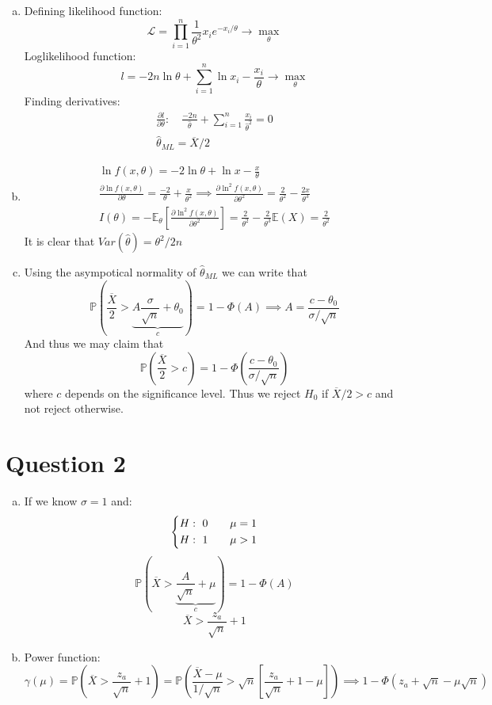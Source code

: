 \documentclass[11pt, oneside]{article}
\newcommand{\E}{\mathbb{E}}
\renewcommand{\P}{\mathbb{P}}
\renewcommand{\t}{\theta}
\begin{document}
\begin{enumerate}[(a)]
	\item Defining likelihood function:
	\[
	\mathcal{L} = \prod_{i=1}^{n} \frac{1}{\t^{2}}x_{i}e^{-x_{i}/\t} \to \max_{\t}
	\]
	Loglikelihood function:
	\[
	l = -2n\ln\t + \sum_{i=1}^{n} \ln x_{i} - \frac{x_{i}}{\t} \to \max_{\t}
	\]
	Finding derivatives:
	\begin{gather*}
		\frac{\partial l }{\partial \t}: \quad \frac{-2n}{\hat\t} + \sum_{i=1}^{n}\frac{x_{i}}{\hat\t^{2}} = 0 \\
		 \hat\t_{ML} = \overline{X}/2
	\end{gather*}
\item \begin{gather*}
	\ln f(x, \t) = -2\ln \t + \ln x - \frac{x}{\t} \\
	\frac{\partial \ln f(x, \t)}{\partial \t} = \frac{-2}{\t} + \frac{x}{\t^{2}} \implies \frac{\partial \ln^{2} f(x, \t)}{\partial \t^{2}} = \frac{2}{\t^{2}}-\frac{2x}{\t^{3}}\\
	I(\t) = - \E_{\t} \left[  \frac{\partial \ln^{2} f(x, \t)}{\partial \t^{2}}\right] = \frac{2}{\t^{2}} - \frac{2}{\t^{3}} \E(X) = \frac{2}{\t^{2}}
\end{gather*}
It is clear that $ Var(\hat\t)  = \t^{2}/2n$
\item Using the asympotical normality of $ \hat\t_{ML} $ we can write that
\[
\P\left( \frac{\overline{X}}{2}  > \underbrace{A\frac{\sigma}{\sqrt{n}} + \t_{0}}_{c}\right) = 1 - \Phi(A) \implies A = \frac{c - \t_{0}}{\sigma/\sqrt{n}}
\]
And thus we may claim that
\[
\P\left( \frac{\overline{X}}{2}  > c \right) = 1 - \Phi\left( \frac{c - \t_{0}}{\sigma/\sqrt{n}} \right)
\]
where $ c $ depends on the significance level.
Thus we reject $ H_{0} $ if $ \overline{X}/2 >c $ and not reject otherwise.
\end{enumerate}

	\section*{Question 2}

\begin{enumerate}[(a)]
	\item If we know $ \sigma = 1 $ and:
	\[
	\begin{dcases}
		H: ~0 \quad\quad \mu = 1 \\
		H: ~1 \quad\quad \mu > 1
	\end{dcases}
	\]
	\[
	\P\left( \overline{X}  > \underbrace{\frac{A}{\sqrt{n}} + \mu}_{c}\right) = 1 - \Phi(A) 
	\]
	\[
	\overline{X} > \frac{z_{a}}{\sqrt{n}} + 1
	\]
\item Power function:
\[
\gamma (\mu) = \P \left( \overline{X} > \frac{z_{a}}{\sqrt{n}} +1 \right) = \P \left( \frac{\overline{X} - \mu}{1/\sqrt{n}} > \sqrt{n} \left[\frac{z_{a}}{\sqrt{n}} + 1 -\mu\right] \right) \implies 1- \Phi \left( z_{a} + \sqrt{n} - \mu\sqrt{n}\right)
\]
\end{enumerate}
\end{document}
